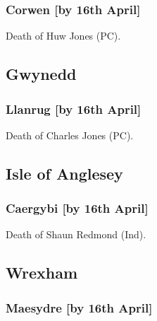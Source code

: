 \documentclass[a4paper,openany]{book}
\begin{document}
\begin{resultsiii}
\subsubsection*{Corwen \hspace*{\fill}\nolinebreak[1]%
	\enspace\hspace*{\fill}
	[by 16th April]}


Death of Huw Jones (PC).

\subsection*{Gwynedd}

\subsubsection*{Llanrug \hspace*{\fill}\nolinebreak[1]%
	\enspace\hspace*{\fill}
	[by 16th April]}


Death of Charles Jones (PC).

\subsection*{Isle of Anglesey}

\subsubsection*{Caergybi \hspace*{\fill}\nolinebreak[1]%
	\enspace\hspace*{\fill}
	[by 16th April]}


Death of Shaun Redmond (Ind).

\subsection*{Wrexham}

\subsubsection*{Maesydre \hspace*{\fill}\nolinebreak[1]%
	\enspace\hspace*{\fill}
	[by 16th April]}


\end{resultsiii}
\end{document}
